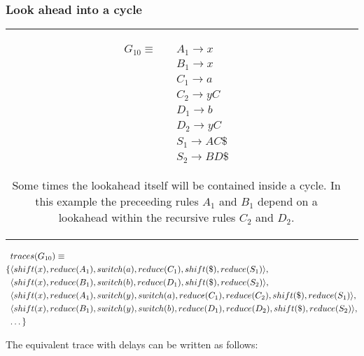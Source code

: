 \documentclass[11pt]{article}
\begin{document}


\subsubsection{Look ahead into a cycle}
\begin{tabular}[t]{cl}
\parbox{.3\textwidth}{
\begin{align*}
G_{10} \equiv \quad & A_1 \rightarrow x\\
                  & B_1 \rightarrow x\\
                  & C_1 \rightarrow a\\
                  & C_2 \rightarrow y C\\
                  & D_1 \rightarrow b\\
                  & D_2 \rightarrow y C\\
                  & S_1 \rightarrow A C \$\\
                  & S_2 \rightarrow B D \$
\end{align*}}
\parbox{.8\textwidth}{Some times the lookahead itself will be contained inside a cycle.
In this example the preceeding rules $A_1$ and $B_1$ depend on a lookahead within the recursive rules $C_2$ and $D_2$.}
\end{tabular}

\parbox{.3\textwidth}{\begin{align*}
&traces(G_{10}) \equiv \\
\{ & \langle shift(x), reduce(A_1), switch(a), reduce(C_1), shift(\$), reduce(S_1) \rangle,\\
   & \langle shift(x), reduce(B_1), switch(b), reduce(D_1), shift(\$), reduce(S_2) \rangle,\\
   & \langle shift(x), reduce(A_1), switch(y), switch(a), reduce(C_1), reduce(C_2), shift(\$), reduce(S_1) \rangle,\\
   & \langle shift(x), reduce(B_1), switch(y), switch(b), reduce(D_1), reduce(D_2), shift(\$), reduce(S_2) \rangle,\\
   & \textellipsis \}
\end{align*}}

The equivalent trace with delays can be written as follows:
\end{document}
